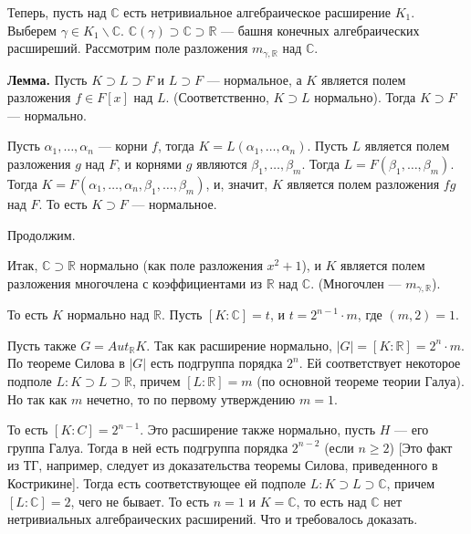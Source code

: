 \documentclass[../main.tex]{subfiles}
\begin{document}
    Теперь, пусть над $\mathbb{C}$ есть нетривиальное алгебраическое расширение
    $K_1$. Выберем $\gamma \in K_1 \backslash \mathbb{C}$.
    $\mathbb{C}(\gamma) \supset \mathbb{C} \supset \mathbb{R}$ ---
    башня конечных алгебраических расширеший. Рассмотрим поле разложения
    $m_{\gamma, \mathbb{R}}$ над $\mathbb{C}$.

    \textbf{Лемма.} Пусть $K \supset L \supset F$ и $L \supset F$ ---
    нормальное, а $K$ является полем разложения $f \in F[x]$ над $L$.
    (Соответственно, $K \supset L$ нормально). Тогда $K \supset F$
    --- нормально.

    Пусть $\alpha_1, \ldots, \alpha_n$ --- корни $f$, тогда
    $K = L(\alpha_1, \ldots, \alpha_n)$. Пусть $L$ является полем разложения
    $g$ над $F$, и корнями $g$ являются $\beta_1, \ldots, \beta_m$. Тогда
    $L = F(\beta_1, \ldots, \beta_m)$. Тогда $K = F(\alpha_1, \ldots, \alpha_n,
    \beta_1, \ldots, \beta_m)$, и, значит, $K$ является полем разложения $fg$
    над $F$. То есть $K \supset F$ --- нормальное.

    Продолжим.

    Итак, $\mathbb{C} \supset \mathbb{R}$ нормально (как поле разложения
    $x^2 + 1$), и $K$ является полем разложения многочлена с коэффициентами
    из $\mathbb{R}$ над $\mathbb{C}$. (Многочлен --- $m_{\gamma, \mathbb{R}}$).

    То есть $K$ нормально над $\mathbb{R}$. Пусть $[K : \mathbb{C}] = t$, и
    $t = 2^{n - 1} \cdot m$, где $(m, 2) = 1$.

    Пусть также $G = Aut_{\mathbb{R}}K$. Так как расширение нормально,
    $|G| = [K : \mathbb{R}] = 2^n \cdot m$. По теореме Силова в $|G|$ есть
    подгруппа порядка $2^n$. Ей соответствует некоторое подполе
    $L: K \supset L \supset \mathbb{R}$, причем $[L : \mathbb{R}] = m$
    (по основной теореме теории Галуа). Но так как $m$ нечетно, то по
    первому утверждению $m = 1$.

    То есть $[K : C] = 2^{n - 1}$. Это расширение также нормально, пусть
    $H$ --- его группа Галуа. Тогда в ней есть подгруппа порядка $2^{n - 2}$
    (если $n \geqslant 2$) [Это факт из ТГ, например, следует из доказательства
    теоремы Силова, приведенного в Кострикине]. Тогда есть
    соответствующее ей подполе $L: K \supset L \supset \mathbb{C}$, причем
    $[L : \mathbb{C}] = 2$, чего не бывает. То есть $n = 1$ и $K = \mathbb{C}$,
    то есть над $\mathbb{C}$ нет нетривиальных алгебраических расширений.
    Что и требовалось доказать.
\end{document}
